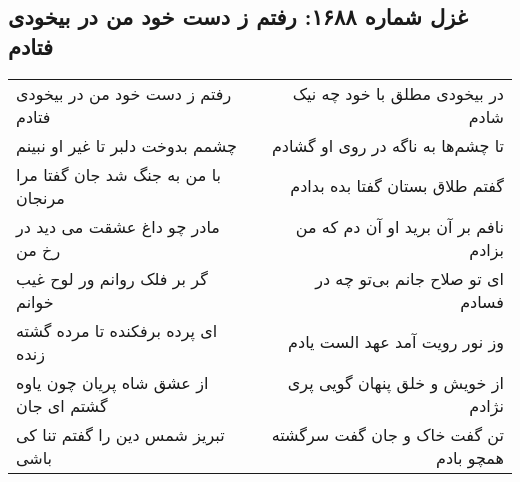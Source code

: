 \begin{center}
\section*{غزل شماره ۱۶۸۸: رفتم ز دست خود من در بیخودی فتادم}
\label{sec:1688}
\begin{longtable}{l p{0.5cm} r}
رفتم ز دست خود من در بیخودی فتادم
&&
در بیخودی مطلق با خود چه نیک شادم
\\
چشمم بدوخت دلبر تا غیر او نبینم
&&
تا چشم‌ها به ناگه در روی او گشادم
\\
با من به جنگ شد جان گفتا مرا مرنجان
&&
گفتم طلاق بستان گفتا بده بدادم
\\
مادر چو داغ عشقت می دید در رخ من
&&
نافم بر آن برید او آن دم که من بزادم
\\
گر بر فلک روانم ور لوح غیب خوانم
&&
ای تو صلاح جانم بی‌تو چه در فسادم
\\
ای پرده برفکنده تا مرده گشته زنده
&&
وز نور رویت آمد عهد الست یادم
\\
از عشق شاه پریان چون یاوه گشتم ای جان
&&
از خویش و خلق پنهان گویی پری نژادم
\\
تبریز شمس دین را گفتم تنا کی باشی
&&
تن گفت خاک و جان گفت سرگشته همچو بادم
\\
\end{longtable}
\end{center}
